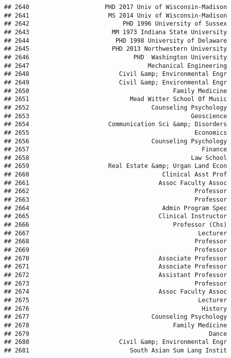 \documentclass[
]{article}
\begin{document}
\begin{verbatim}
## 2640                     PHD 2017 Univ of Wisconsin-Madison
## 2641                      MS 2014 Univ of Wisconsin-Madison
## 2642                          PHD 1996 University of Sussex
## 2643                       MM 1973 Indiana State University
## 2644                        PHD 1998 University of Delaware
## 2645                       PHD 2013 Northwestern University
## 2646                             PHD  Washington University
## 2647                                 Mechanical Engineering
## 2648                         Civil &amp; Environmental Engr
## 2649                         Civil &amp; Environmental Engr
## 2650                                        Family Medicine
## 2651                            Mead Witter School Of Music
## 2652                                  Counseling Psychology
## 2653                                             Geoscience
## 2654                      Communication Sci &amp; Disorders
## 2655                                              Economics
## 2656                                  Counseling Psychology
## 2657                                                Finance
## 2658                                             Law School
## 2659                      Real Estate &amp; Urgan Land Econ
## 2660                                     Clinical Asst Prof
## 2661                                    Assoc Faculty Assoc
## 2662                                              Professor
## 2663                                              Professor
## 2664                                     Admin Program Spec
## 2665                                    Clinical Instructor
## 2666                                        Professor (Chs)
## 2667                                               Lecturer
## 2668                                              Professor
## 2669                                              Professor
## 2670                                    Associate Professor
## 2671                                    Associate Professor
## 2672                                    Assistant Professor
## 2673                                              Professor
## 2674                                    Assoc Faculty Assoc
## 2675                                               Lecturer
## 2676                                                History
## 2677                                  Counseling Psychology
## 2678                                        Family Medicine
## 2679                                                  Dance
## 2680                         Civil &amp; Environmental Engr
## 2681                            South Asian Sum Lang Instit

\end{verbatim}
\end{document}
